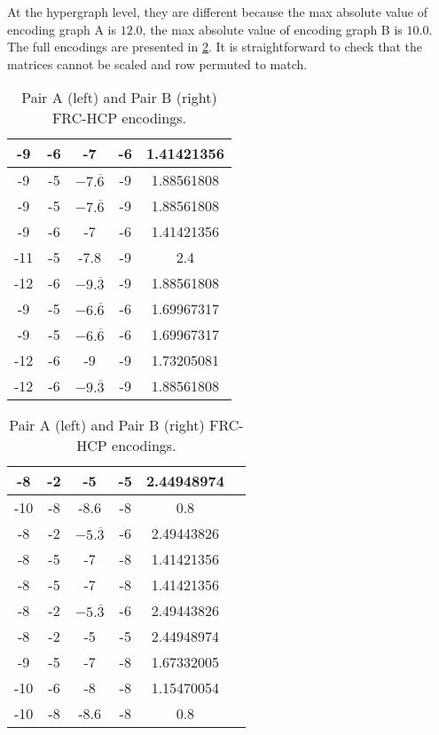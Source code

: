 At the hypergraph level, they are different because the max absolute value of encoding graph A is $12.0$, the max absolute value of encoding graph B is $10.0$. The full encodings are presented in \ref{tab:sidetables-hg-frc}. It is straightforward to check that the matrices cannot be scaled and row permuted to match.

\begin{table}[H]
\footnotesize
\centering
\begin{tabular}{|c|c|c|c|c|}
    \hline
    -9 & -6 & -7          & -6 & 1.41421356 \\ \hline
    -9 & -5 & $-7.\overline{6}$ & -9 & 1.88561808 \\ \hline
    -9 & -5 & $-7.\overline{6}$ & -9 & 1.88561808 \\ \hline
    -9 & -6 & -7          & -6 & 1.41421356 \\ \hline
    -11 & -5 & -7.8       & -9 & 2.4 \\ \hline
    -12 & -6 & $-9.\overline{3}$ & -9 & 1.88561808 \\ \hline
    -9 & -5 & $-6.\overline{6}$ & -6 & 1.69967317 \\ \hline
    -9 & -5 & $-6.\overline{6}$ & -6 & 1.69967317 \\ \hline
    -12 & -6 & -9         & -9 & 1.73205081 \\ \hline
    -12 & -6 & $-9.\overline{3}$ & -9 & 1.88561808 \\ \hline
\end{tabular}
\begin{tabular}{|c|c|c|c|c|c|}
\hline
    -8 & -2 & -5 & -5 & 2.44948974 \\ \hline
    -10 & -8 & -8.6 & -8 & 0.8 \\ \hline
    -8 & -2 & $-5.\overline{3}$ & -6 & 2.49443826 \\ \hline
    -8 & -5 & -7 & -8 & 1.41421356 \\ \hline
    -8 & -5 & -7 & -8 & 1.41421356 \\ \hline
    -8 & -2 & $-5.\overline{3}$ & -6 & 2.49443826 \\ \hline
    -8 & -2 & -5 & -5 & 2.44948974 \\ \hline
    -9 & -5 & -7 & -8 & 1.67332005 \\ \hline
    -10 & -6 & -8 & -8 & 1.15470054 \\ \hline
    -10 & -8 & -8.6 & -8 & 0.8 \\ \hline
\end{tabular}
\caption{Pair A (left) and Pair B (right) FRC-HCP encodings.}
\label{tab:sidetables-hg-frc}
\end{table}

